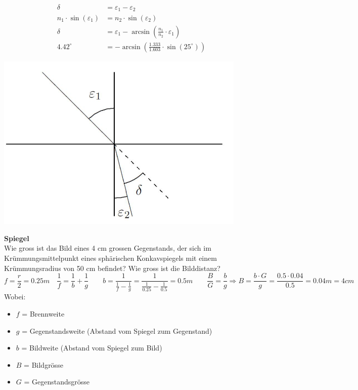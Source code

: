 \begin{minipage}{0.69\textwidth}
\begin{align*}
	\delta &= \varepsilon_1-\varepsilon_2\\
	n_1\cdot \sin(\varepsilon_1) &= n_2\cdot \sin(\varepsilon_2)\\
	\delta &= \varepsilon_1 - \arcsin\left(\frac{n_1}{n_2}\cdot \varepsilon_1\right)\\
	4.42^\circ&=-\arcsin\left(\frac{1.333}{1.603}\cdot \sin(25^\circ)\right)
\end{align*}
\end{minipage}
\begin{minipage}{0.3\textwidth}
	\includegraphics[width=0.9\textwidth]{bilder/lichtbrech.png}
\end{minipage}

\textbf{Spiegel}\\
Wie gross ist das Bild eines 4 cm grossen Gegenstands, der sich im Krümmungsmittelpunkt eines sphärischen Konkavspiegels mit einem Krümmungsradius von 50 cm befindet? Wie gross ist die Bilddistanz?
\[
	f=\frac{r}{2} = 0.25m\quad \frac{1}{f} = \frac{1}{b}+\frac{1}{g} \qquad b= \frac{1}{\frac{1}{f}-\frac{1}{g}} = \frac{1}{\frac{1}{0.25}- \frac{1}{0.5}} = 0.5m \qquad \frac{B}{G} = \frac{b}{g} \Rightarrow B= \frac{b\cdot G}{g} = \frac{0.5\cdot 0.04}{0.5} = 0.04m = 4cm
 \]
Wobei: \begin{itemize}
			\itemsep0em
			\item $f$ = Brennweite
			\item $g$ = Gegenstandsweite (Abstand vom Spiegel zum Gegenstand)
			\item $b$ = Bildweite (Abstand vom Spiegel zum Bild)
			\item $B$ = Bildgrösse
			\item $G$ = Gegenstandsgrösse
\end{itemize}

